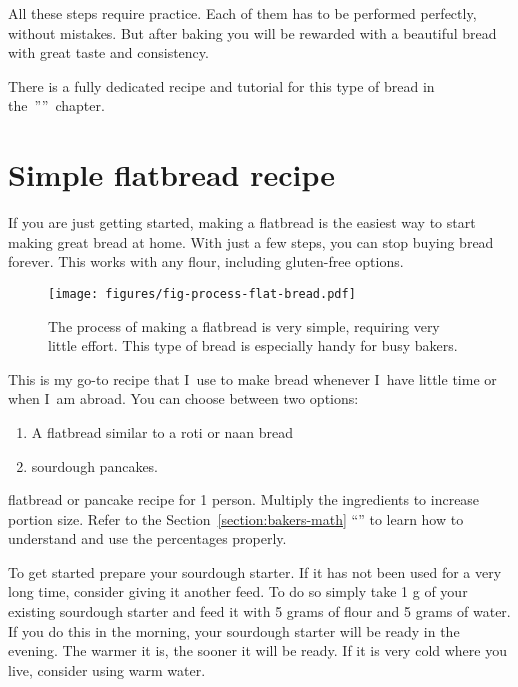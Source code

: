 All these steps require practice. Each of them has to be
performed perfectly, without mistakes.
But after baking you will be rewarded with a beautiful bread
with great taste and consistency.

There is a fully dedicated recipe and tutorial
for this type of bread in the~''''~chapter.

\section{Simple flatbread recipe}
\label{section:flat-bread-recipe}

If you are just getting started, making a flatbread is the
easiest way to start making great bread at home. With just a
few steps, you can stop buying bread forever. This works with
any flour, including gluten-free options.

\begin{figure}[!htb]
  \texttt{[image: figures/fig-process-flat-bread.pdf]}
  \caption{The process of making a flatbread is very simple, requiring very little effort. This
  type of bread is especially handy for busy bakers.}
  \label{fig:flat-bread-process}
\end{figure}

This is my go-to recipe that I~use to make bread whenever
I~have little time or when I~am abroad. You can choose
between two options:
%
\begin{enumerate}
    \item A flatbread similar to a roti or naan bread
    \item sourdough pancakes.
\end{enumerate}

\begin{table}[!htb]
    \begin{center}
        
        \caption{\label{tab:flat-bread-ingredients}flatbread or pancake recipe
            for 1 person. Multiply the ingredients to increase portion size.
            Refer to the Section~\ref{section:bakers-math}
            ``'' to learn how to understand and
            use the percentages properly.}
    \end{center}
\end{table}

To get started prepare your sourdough starter. If it has not been used for a very
long time, consider giving it another feed. To do so simply take 1 g of your
existing sourdough starter and feed it with 5 grams of flour and 5 grams of water.
If you do this in the morning, your sourdough starter will be ready in the evening. The
warmer it is, the sooner it will be ready. If it is very cold where you live, consider
using warm water.

